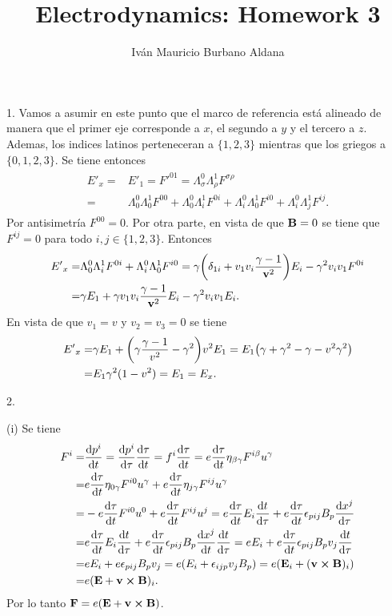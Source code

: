 \documentclass[11pt]{article}
\title{Electrodynamics: Homework 3}
\author{Iván Mauricio Burbano Aldana}
\begin{document}
\maketitle

1. Vamos a asumir en este punto que el marco de referencia está alineado de manera que el primer eje corresponde a $x$, el segundo a $y$ y el tercero a $z$. Ademas, los indices latinos perteneceran a $\{1,2,3\}$ mientras que los griegos a $\{0,1,2,3\}$. Se tiene entonces
\begin{align}
\begin{split}
{E'}_x=&{E'}_1={F'}^{01}=\Lambda^0_\sigma\Lambda^1_\rho F^{\sigma\rho}\\
=&\Lambda^0_0\Lambda^1_0F^{00}+\Lambda^0_0\Lambda^1_iF^{0i}+\Lambda^0_i\Lambda^1_0F^{i0}+\Lambda^0_i\Lambda^1_jF^{ij}.
\end{split}
\end{align}
Por antisimetría $F^{00}=0$. Por otra parte, en vista de que $\vb{B}=0$ se tiene que $F^{ij}=0$ para todo $i,j\in\{1,2,3\}$. Entonces
\begin{align}
\begin{split}
{E'}_x=&\Lambda^0_0\Lambda^1_iF^{0i}+\Lambda^0_i\Lambda^1_0F^{i0}=\gamma\qty(\delta_{1i}+v_1v_i\frac{\gamma-1}{\vb{v}^2})E_i-\gamma^2 v_iv_1F^{0i}\\
=&\gamma E_1+\gamma v_1v_i\frac{\gamma-1}{\vb{v}^2}E_i-\gamma^2 v_iv_1E_i.
\end{split}
\end{align}
En vista de que $v_1=v$ y $v_2=v_3=0$ se tiene
\begin{align}
\begin{split}
{E'}_x=&\gamma E_1+\qty(\gamma\frac{\gamma-1}{v^2}-\gamma^2)v^2E_1=E_1\qty(\gamma+\gamma^2-\gamma-v^2\gamma^2)\\
=&E_1\gamma^2(1-v^2)=E_1=E_x.
\end{split}
\end{align}

2. 

(i) Se tiene
\begin{align}
\begin{split}
F^i=&\dv{p^i}{t}=\dv{p^i}{\tau}\dv{\tau}{t}=f^i\dv{\tau}{t}=e\dv{\tau}{t}\eta_{\beta\gamma}F^{i\beta}u^\gamma\\
=&e\dv{\tau}{t}\eta_{0\gamma}F^{i0}u^\gamma+e\dv{\tau}{t}\eta_{j\gamma}F^{ij}u^\gamma\\
=&-e\dv{\tau}{t}F^{i0}u^0+e\dv{\tau}{t}F^{ij}u^j=e\dv{\tau}{t}E_i\dv{t}{\tau}+e\dv{\tau}{t}\epsilon_{pij}B_p\dv{x^j}{\tau}\\
=&e\dv{\tau}{t}E_i\dv{t}{\tau}+e\dv{\tau}{t}\epsilon_{pij}B_p\dv{x^j}{t}\dv{t}{\tau}=eE_i+e\dv{\tau}{t}\epsilon_{pij}B_pv_j\dv{t}{\tau}\\
=&eE_i+e\epsilon_{pij}B_pv_j=e(E_i+\epsilon_{ijp}v_jB_p)=e(\vb{E}_i+(\vb{v}\cross\vb{B})_i)\\
=&e(\vb{E}+\vb{v}\cross\vb{B})_i.
\end{split}
\end{align}
Por lo tanto $\vb{F}=e(\vb{E}+\vb{v}\cross\vb{B})$.
\end{document}
